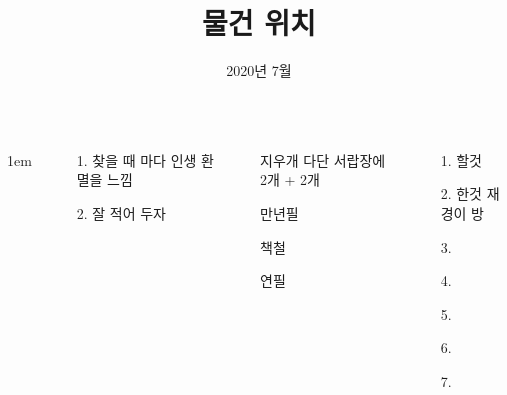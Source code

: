 \documentclass[20pt, a1paper ]{tikzposter}
\title{ 물건 위치 }
\author{ 2020년 7월 }
\begin{document}
	\maketitle

	\begin{columns}


			{
					\setlength{\leftmargini}{7em}
					\setlength{\labelsep} {1em}
				\begin{LARGE}
					\begin{itemize}
					\item [1.] 찾을 때 마다 인생 환멸을 느낌
					\item [2.]  잘 적어 두자
					\end{itemize}
				\end{LARGE}
			}


		{
			\setlength{\leftmargini}{7em}			
			\setlength{\labelsep}{1em} %

			\begin{LARGE}
			\begin{itemize}
			\item [지우개] 다단 서랍장에 2개 + 2개 
			\item [만년필]
			\item [책철] 
			\item [연필] 


			\end{itemize}
			\end{LARGE}

		}

		{
			\setlength{\leftmargini}{5em}			
			\setlength{\labelsep}{1em} %
			\begin{LARGE}
			\begin{itemize}
			\item [1.] 할것 
			\item [2.] 한것 재경이 방
			\item [3.] 
			\item [4.] 
			\item [5.] 
			\item [6.] 
			\item [7.] 
			\end{itemize}
			\end{LARGE}

}
\end{columns}
\end{document}
